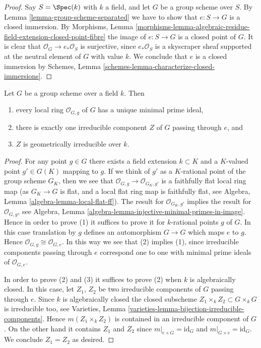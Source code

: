 \begin{proof}
Say $S = \Spec(k)$ with $k$ a field, and let $G$ be a group scheme
over $S$. By
Lemma \ref{lemma-group-scheme-separated}
we have to show that $e : S \to G$ is a closed immersion. By
Morphisms, Lemma
\ref{morphisms-lemma-algebraic-residue-field-extension-closed-point-fibre}
the image of $e : S \to G$ is a closed point of $G$.
It is clear that $\mathcal{O}_G \to e_*\mathcal{O}_S$ is surjective,
since $e_*\mathcal{O}_S$ is a skyscraper sheaf supported at the neutral
element of $G$ with value $k$. We conclude that $e$ is a closed immersion by
Schemes, Lemma \ref{schemes-lemma-characterize-closed-immersions}.
\end{proof}

\begin{lemma}
\label{lemma-group-scheme-field-geometrically-irreducible}
Let $G$ be a group scheme over a field $k$.
Then
\begin{enumerate}
\item every local ring $\mathcal{O}_{G, g}$ of $G$ has a unique
minimal prime ideal,
\item there is exactly one irreducible component $Z$ of $G$
passing through $e$, and
\item $Z$ is geometrically irreducible over $k$.
\end{enumerate}
\end{lemma}

\begin{proof}
For any point $g \in G$ there exists a field extension
$k \subset K$ and a $K$-valued point $g' \in G(K)$ mapping to
$g$. If we think of $g'$ as a $K$-rational point of the
group scheme $G_K$, then we see that
$\mathcal{O}_{G, g} \to \mathcal{O}_{G_K, g'}$ is a faithfully flat
local ring map (as $G_K \to G$ is flat, and a local flat ring map
is faithfully flat, see
Algebra, Lemma \ref{algebra-lemma-local-flat-ff}).
The result for $\mathcal{O}_{G_K, g'}$ implies the
result for $\mathcal{O}_{G, g}$, see
Algebra, Lemma \ref{algebra-lemma-injective-minimal-primes-in-image}.
Hence in order to prove (1) it suffices to
prove it for $k$-rational points $g$ of $G$. In this case
translation by $g$ defines an automorphism $G \to G$
which maps $e$ to $g$. Hence $\mathcal{O}_{G, g} \cong \mathcal{O}_{G, e}$.
In this way we see that (2) implies (1), since irreducible components
passing through $e$ correspond one to one with minimal prime ideals
of $\mathcal{O}_{G, e}$.

\medskip\noindent
In order to prove (2) and (3) it suffices to prove (2) when $k$
is algebraically closed. In this case, let $Z_1$, $Z_2$ be two
irreducible components of $G$ passing through $e$.
Since $k$ is algebraically closed the closed subscheme
$Z_1 \times_k Z_2 \subset G \times_k G$ is irreducible too, see
Varieties, Lemma \ref{varieties-lemma-bijection-irreducible-components}.
Hence $m(Z_1 \times_k Z_2)$ is contained in an irreducible
component of $G$. On the other hand it contains
$Z_1$ and $Z_2$ since $m|_{e \times G} = \text{id}_G$ and
$m|_{G \times e} = \text{id}_G$. We conclude $Z_1 = Z_2$ as desired.
\end{proof}

